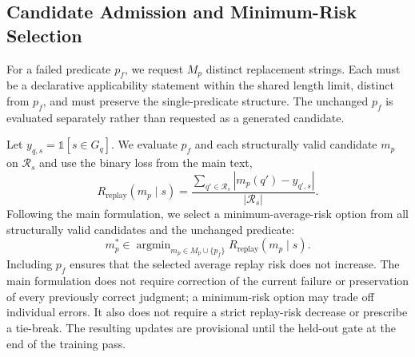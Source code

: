 \subsection{Candidate Admission and Minimum-Risk Selection}
\label{app:procedure-mbr}
For a failed predicate $p_f$, we request $M_p$ distinct replacement strings. Each must be a declarative applicability statement within the shared length limit, distinct from $p_f$, and must preserve the single-predicate structure. The unchanged $p_f$ is evaluated separately rather than requested as a generated candidate.

Let $y_{q,s}=\mathds{1}[s\in G_q]$. We evaluate $p_f$ and each structurally valid candidate $m_p$ on $\mathcal R_s$ and use the binary loss from the main text,
\[
R_{\mathrm{replay}}(m_p\mid s)
=\frac{\sum_{q'\in\mathcal R_s}|m_p(q')-y_{q',s}|}
{|\mathcal R_s|}.
\]
Following the main formulation, we select a minimum-average-risk option from all structurally valid candidates and the unchanged predicate:
\[
m_p^*\in\mathop{\arg\min}_{m_p\in M_p\cup\{p_f\}}
R_{\mathrm{replay}}(m_p\mid s).
\]
Including $p_f$ ensures that the selected average replay risk does not increase. The main formulation does not require correction of the current failure or preservation of every previously correct judgment; a minimum-risk option may trade off individual errors. It also does not require a strict replay-risk decrease or prescribe a tie-break. The resulting updates are provisional until the held-out gate at the end of the training pass.
